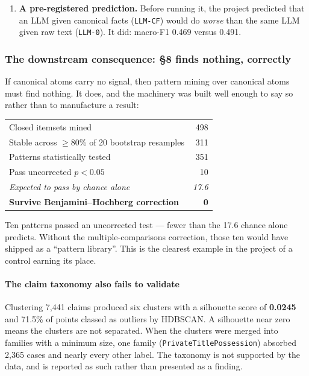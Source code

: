 \documentclass[12pt,a4paper]{article}
\newcommand{\code}[1]{\texttt{\small #1}}
\begin{document}
\begin{enumerate}
\item \textbf{A pre-registered prediction.} Before running it, the project predicted that an LLM
given canonical facts (\code{LLM-CF}) would do \emph{worse} than the same LLM given raw text
(\code{LLM-0}). It did: macro-F1 0.469 versus 0.491.
\end{enumerate}

\subsubsection*{The downstream consequence: §8 finds nothing, correctly}

If canonical atoms carry no signal, then pattern mining over canonical atoms must find nothing. It
does, and the machinery was built well enough to say so rather than to manufacture a result:

\begin{center}
\begin{tabular}{@{}lr@{}}
\toprule
Closed itemsets mined                                   & 498 \\
Stable across $\geq$80\% of 20 bootstrap resamples      & 311 \\
Patterns statistically tested                            & 351 \\
Pass uncorrected $p<0.05$                                & 10 \\
\emph{Expected to pass by chance alone}                  & \emph{17.6} \\
\textbf{Survive Benjamini--Hochberg correction}          & \textbf{0} \\
\bottomrule
\end{tabular}
\end{center}

Ten patterns passed an uncorrected test --- fewer than the 17.6 chance alone predicts. Without the
multiple-comparisons correction, those ten would have shipped as a ``pattern library''. This is the
clearest example in the project of a control earning its place.

\paragraph{The claim taxonomy also fails to validate} Clustering 7,441 claims produced six clusters
with a silhouette score of \textbf{0.0245} and 71.5\% of points classed as outliers by HDBSCAN. A
silhouette near zero means the clusters are not separated. When the clusters were merged into
families with a minimum size, one family (\code{PrivateTitlePossession}) absorbed 2,365 cases and
nearly every other label. The taxonomy is not supported by the data, and is reported as such rather
than presented as a finding.
\end{document}
